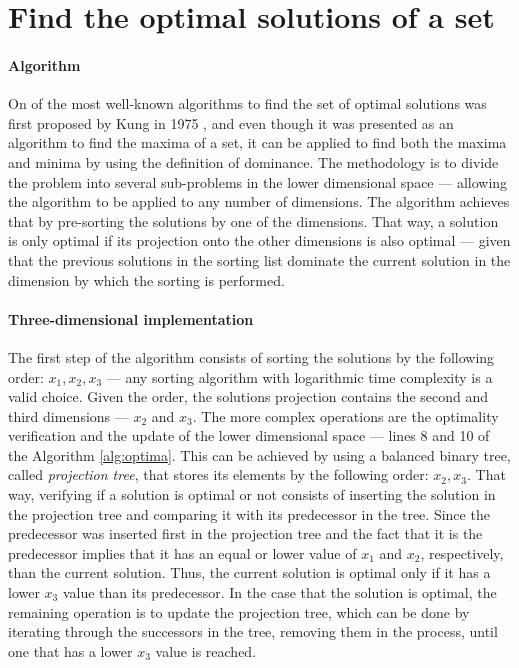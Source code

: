 \section{Find the optimal solutions of a set}

\paragraph{Algorithm} On of the most well-known algorithms to find the set of optimal solutions was first proposed by Kung in 1975 \cite{kung_optima}, and even though it was presented as an algorithm to find the maxima of a set, it can be applied to find both the maxima and minima by using the definition of dominance. The methodology is to divide the problem into several sub-problems in the lower dimensional space --- allowing the algorithm to be applied to any number of dimensions. The algorithm achieves that by pre-sorting the solutions by one of the dimensions. That way, a solution is only optimal if its projection onto the other dimensions is also optimal --- given that the previous solutions in the sorting list dominate the current solution in the dimension by which the sorting is performed.



\paragraph{Three-dimensional implementation} The first step of the algorithm consists of sorting the solutions by the following order: $x_1,x_2,x_3$ --- any sorting algorithm with logarithmic time complexity is a valid choice. Given the order, the solutions projection contains the second and third dimensions --- $x_2$ and $x_3$. The more complex operations are the optimality verification and the update of the lower dimensional space --- lines 8 and 10 of the Algorithm \ref{alg:optima}. This can be achieved by using a balanced binary tree, called \textit{projection tree}, that stores its elements by the following order: $x_2,x_3$. That way, verifying if a solution is optimal or not consists of inserting the solution in the projection tree and comparing it with its predecessor in the tree. Since the predecessor was inserted first in the projection tree and the fact that it is the predecessor implies that it has an equal or lower value of $x_1$ and $x_2$, respectively, than the current solution. Thus, the current solution is optimal only if it has a lower $x_3$ value than its predecessor. In the case that the solution is optimal, the remaining operation is to update the projection tree, which can be done by iterating through the successors in the tree, removing them in the process, until one that has a lower $x_3$ value is reached.


